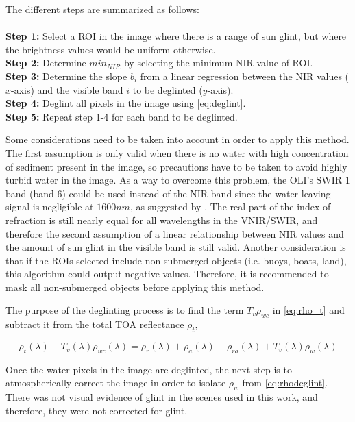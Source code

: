 The different steps are summarized as follows:\\
\\
{\bf Step 1:} Select a ROI in the image where there is a range of sun glint, but where the brightness values would be uniform otherwise.\\
{\bf Step 2:} Determine $min_{NIR}$ by selecting the minimum NIR value of ROI.\\
{\bf Step 3:} Determine the slope $b_i$ from a linear regression between the NIR values ($x$-axis) and the visible band $i$ to be deglinted ($y$-axis).\\
{\bf Step 4:} Deglint all pixels in the image using \autoref{eq:deglint}.\\
{\bf Step 5:} Repeat step 1-4 for each band to be deglinted.

Some considerations need to be taken into account in order to apply this method. The first assumption is only valid when there is no water with high concentration of sediment present in the image, so precautions have to be taken to avoid highly turbid water in the image. As a way to overcome this problem, the OLI's SWIR 1 band (band 6) could be used instead of the NIR band since the water-leaving signal is negligible at $1600nm$, as suggested by \citet{GeraceThesis}. The real part of the index of refraction is still nearly equal for all wavelengths in the VNIR/SWIR, and therefore the second assumption of a linear relationship between NIR values and the amount of sun glint in the visible band is still valid. Another consideration is that if the ROIs selected include non-submerged objects (i.e. buoys, boats, land), this algorithm could output negative values. Therefore, it is recommended to mask all non-submerged objects before applying this method. 

The purpose of the deglinting process is to find the term $T_v\rho_{wc}$ in \autoref{eq:rho_t} and subtract it from the total TOA reflectance $\rho_t$,

\begin{equation}\label{eq:rhodeglint}
  \rho_t(\lambda)-T_v(\lambda)\rho_{wc}(\lambda) = \rho_r(\lambda)+\rho_a(\lambda)+\rho_{ra}(\lambda)+T_v(\lambda)\rho_{w}(\lambda)
\end{equation}

Once the water pixels in the image are deglinted, the next step is to atmospherically correct the image in order to isolate $\rho_w$ from \autoref{eq:rhodeglint}. There was not visual evidence of glint in the scenes used in this work, and therefore, they were not corrected for glint.


